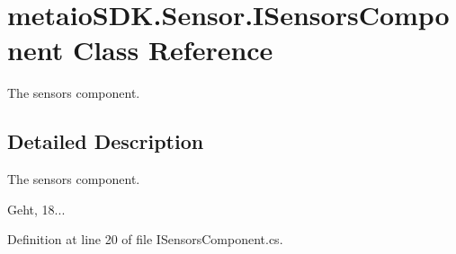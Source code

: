 \section{metaio\-S\-D\-K.\-Sensor.\-I\-Sensors\-Component Class Reference}
\label{classmetaio_s_d_k_1_1_sensor_1_1_i_sensors_component}


The sensors component.  




\subsection{Detailed Description}
The sensors component. 

Geht, 18... 

Definition at line 20 of file I\-Sensors\-Component.\-cs.

